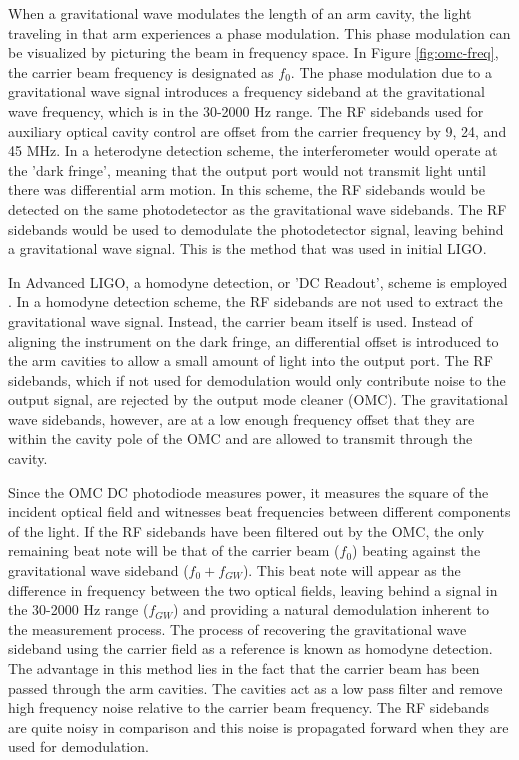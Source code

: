 When a gravitational wave modulates the length of an arm cavity, the light 
traveling in that arm experiences a phase modulation. This phase modulation 
can be visualized by picturing the beam in frequency space. In Figure 
\ref{fig:omc-freq}, the carrier beam frequency is designated as $f_0$. 
The phase modulation due to 
a gravitational wave signal introduces a frequency sideband at the 
gravitational wave frequency, which is in the 30-2000 Hz range. 
The 
RF sidebands used for auxiliary optical cavity control are offset from the 
carrier frequency by 9, 24, and 45 MHz. 
In a heterodyne detection scheme, the interferometer would operate at the 
'dark fringe', meaning that the output port would not transmit light until 
there was differential arm motion. In this scheme, the RF sidebands would be 
detected on the same photodetector as the gravitational wave sidebands. The 
RF sidebands would be used to demodulate the photodetector signal, leaving 
behind a gravitational wave signal. This is the method that was used in 
initial LIGO.

In Advanced LIGO, a homodyne detection, or 'DC Readout', scheme is employed 
\cite{DCReadout}. 
In a homodyne detection scheme, the RF sidebands are not used to extract the 
gravitational wave signal. Instead, the carrier beam itself is used. Instead of 
aligning the instrument on the dark fringe, an differential offset is introduced 
to the arm cavities to allow a small amount of light into the output port. 
The RF sidebands, which if not used for demodulation would only contribute 
noise to the output signal, 
are rejected by the output mode cleaner (OMC). 
The gravitational wave sidebands, however, are at a 
low enough frequency offset that they are within the cavity pole of the OMC 
and are allowed to transmit through the cavity.

Since the OMC DC photodiode measures power, it measures the square of the 
incident optical field and witnesses beat frequencies between different 
components of the light. If the RF sidebands have been filtered out by 
the OMC, the only remaining beat note will be that of the carrier beam ($f_0$) 
beating against the gravitational wave sideband ($f_0 + f_{GW}$). This beat note will 
appear as the difference in frequency between the two optical fields, 
leaving behind a signal in the 30-2000 Hz range ($f_{GW}$) and providing a 
natural demodulation inherent to the measurement process. 
The process of recovering the gravitational wave sideband using the 
carrier field as a reference is known as homodyne detection. The 
advantage in this method lies in the fact that the carrier beam 
has been passed through the arm cavities. The cavities act as a low 
pass filter and remove high frequency noise relative to the carrier 
beam frequency. The RF sidebands are quite noisy in comparison and this 
noise is propagated forward when they are used for demodulation. 

